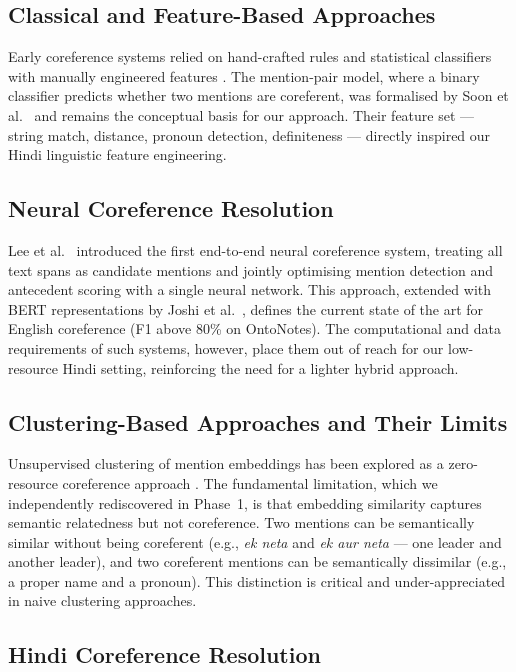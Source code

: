 \documentclass[12pt,a4paper]{report}
\begin{document}
\subsection{Classical and Feature-Based Approaches}

Early coreference systems relied on hand-crafted rules and statistical classifiers with manually engineered features \cite{lappin1994algorithm}. The mention-pair model, where a binary classifier predicts whether two mentions are coreferent, was formalised by Soon et al.\ \cite{soon2001machine} and remains the conceptual basis for our approach. Their feature set --- string match, distance, pronoun detection, definiteness --- directly inspired our Hindi linguistic feature engineering.

\subsection{Neural Coreference Resolution}

Lee et al.\ \cite{lee2017end} introduced the first end-to-end neural coreference system, treating all text spans as candidate mentions and jointly optimising mention detection and antecedent scoring with a single neural network. This approach, extended with BERT representations by Joshi et al.\ \cite{joshi2019bert}, defines the current state of the art for English coreference (F1 above 80\% on OntoNotes). The computational and data requirements of such systems, however, place them out of reach for our low-resource Hindi setting, reinforcing the need for a lighter hybrid approach.

\subsection{Clustering-Based Approaches and Their Limits}

Unsupervised clustering of mention embeddings has been explored as a zero-resource coreference approach \cite{moosavi2016coreference}. The fundamental limitation, which we independently rediscovered in Phase~1, is that embedding similarity captures semantic relatedness but not coreference. Two mentions can be semantically similar without being coreferent (e.g., \textit{ek neta} and \textit{ek aur neta} --- one leader and another leader), and two coreferent mentions can be semantically dissimilar (e.g., a proper name and a pronoun). This distinction is critical and under-appreciated in naive clustering approaches.

\subsection{Hindi Coreference Resolution}
\end{document}
